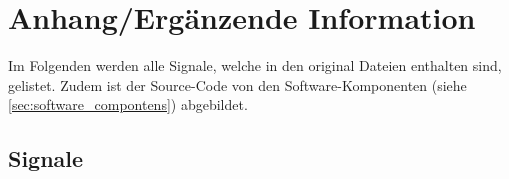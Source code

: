 %
%
%
%
%

\chapter{Anhang/Ergänzende Information}
\label{chap:app}

Im Folgenden werden alle Signale, welche in den original Dateien enthalten sind, gelistet. Zudem ist der Source-Code von den Software-Komponenten (siehe \ref{sec:software_compontens}) abgebildet.

\section{Signale}

